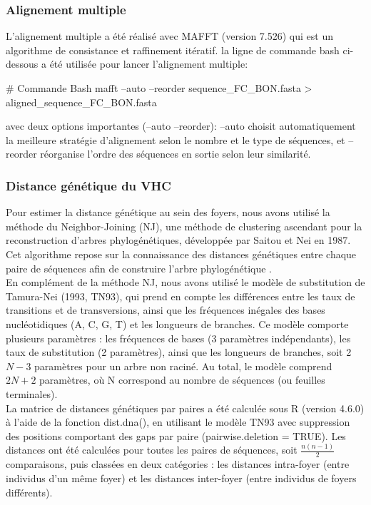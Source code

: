 \documentclass[a4paper,12pt]{article}
\begin{document}
\subsubsection *{Alignement multiple}

L’alignement multiple a été réalisé avec MAFFT (version 7.526) qui est un algorithme de consistance et raffinement itératif. la ligne de commande bash ci-dessous a été utilisée pour lancer l'alignement multiple:
\begin{terminal}
# Commande Bash 
 mafft --auto --reorder sequence_FC_BON.fasta > aligned_sequence_FC_BON.fasta
\end{terminal}
avec deux options importantes (--auto --reorder):  --auto choisit automatiquement la meilleure stratégie d’alignement selon le nombre et le type de séquences, et --reorder réorganise l’ordre des séquences en sortie selon leur similarité. 

\subsubsection {Distance génétique du VHC}
Pour estimer la distance génétique au sein des foyers, nous avons utilisé la méthode du Neighbor-Joining (NJ), une méthode de clustering ascendant pour la reconstruction d’arbres phylogénétiques, développée par Saitou et Nei en 1987. Cet algorithme repose sur la connaissance des distances génétiques entre chaque paire de séquences  afin de construire l’arbre phylogénétique  \cite{NeighborJoining2026}.\\
En complément de la méthode NJ, nous avons utilisé le modèle de substitution de Tamura-Nei (1993, TN93), qui prend en compte les différences entre les taux de transitions et de transversions, ainsi que les fréquences inégales des bases nucléotidiques (A, C, G, T) et les longueurs de branches. Ce modèle comporte plusieurs paramètres : les fréquences de bases (3 paramètres indépendants), les taux de substitution (2 paramètres), ainsi que les longueurs de branches, soit 2$N - 3$ paramètres pour un arbre non raciné. Au total, le modèle comprend $2N + 2$ paramètres, où N correspond au nombre de séquences (ou feuilles terminales).\\
La matrice de distances génétiques par paires a été calculée sous R (version 4.6.0) à l’aide de la fonction dist.dna(), en utilisant le modèle TN93 avec suppression des positions comportant des gaps par paire (pairwise.deletion = TRUE). Les distances ont été calculées pour toutes les paires de séquences, soit $\frac{n(n-1)}{2}$ comparaisons, puis classées en deux catégories : les distances intra-foyer (entre individus d’un même foyer) et les distances inter-foyer (entre individus de foyers différents).
\end{document}
